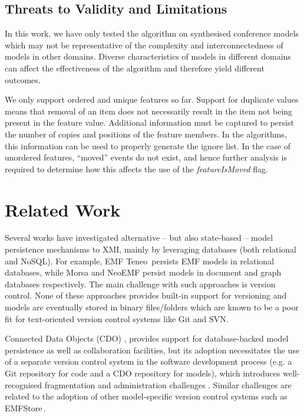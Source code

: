 \documentclass{llncs}
\begin{document}
\subsection{Threats to Validity and Limitations}
\label{sec:limitations_and_future_work}
In this work, we have only tested the algorithm on synthesised conference models which may not be representative of the complexity and interconnectedness of models in other domains. Diverse characteristics of models in different domains can affect the effectiveness of the algorithm and therefore yield different outcomes. %

We only support ordered and unique features so far. Support for duplicate values means that removal of an item does not necessarily result in the item not being present in the feature value. Additional information must be captured to persist the number of copies and positions of the feature members. In the algorithms, this information can be used to properly generate the ignore list. In the case of unordered features, ``moved'' events do not exist, and hence further analysis is required to determine how this affects the use of the \emph{featureIsMoved} flag. 

\section{Related Work}
\label{sec:related_work}

Several works have investigated alternative -- but also state-based -- model persistence mechanisms to XMI, mainly by leveraging databases (both relational and NoSQL). For example, EMF Teneo\,\cite{eclipse2017teneo} persists EMF models in relational databases, while Morsa \cite{pagan2011morsa} and NeoEMF \cite{daniel2016neoemf} persist models in document and graph databases respectively. The main challenge with such approaches is version control. None of these approaches provides built-in support for versioning and models are eventually stored in binary files/folders which are known to be a poor fit for text-oriented version control systems like Git and SVN.

Connected Data Objects (CDO) \cite{eclipse2017cdo}, provides support for database-backed model persistence as well as collaboration facilities, but its adoption necessitates the use of a separate version control system in the software development process (e.g. a Git repository for code and a CDO repository for models), which introduces well-recognised fragmentation and administration challenges \cite{barmpis2014evaluation}. Similar challenges are related to the adoption of other model-specific version control systems such as EMFStore\,\cite{koegel2010emfstore}.
\end{document}
